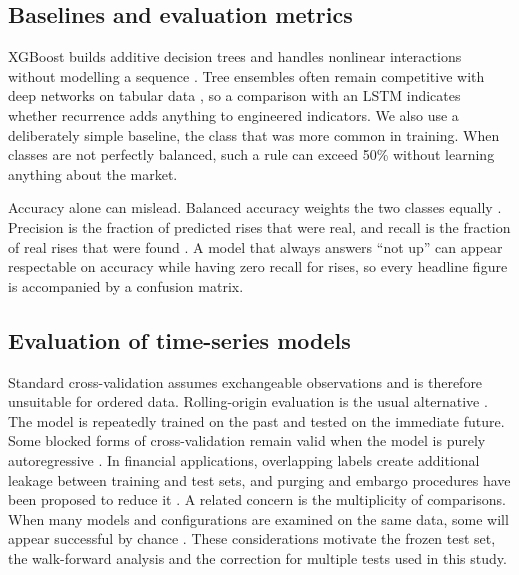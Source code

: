 \subsection{Baselines and evaluation metrics}
XGBoost builds additive decision trees and handles nonlinear interactions without modelling a sequence \cite{chen2016}. Tree ensembles often remain competitive with deep networks on tabular data \cite{grinsztajn2022}, so a comparison with an LSTM indicates whether recurrence adds anything to engineered indicators. We also use a deliberately simple baseline, the class that was more common in training. When classes are not perfectly balanced, such a rule can exceed 50\% without learning anything about the market.

Accuracy alone can mislead. Balanced accuracy weights the two classes equally \cite{brodersen2010}. Precision is the fraction of predicted rises that were real, and recall is the fraction of real rises that were found \cite{sokolova2009}. A model that always answers ``not up'' can appear respectable on accuracy while having zero recall for rises, so every headline figure is accompanied by a confusion matrix.

\subsection{Evaluation of time-series models}
Standard cross-validation assumes exchangeable observations and is therefore unsuitable for ordered data. Rolling-origin evaluation is the usual alternative \cite{tashman2000,hyndman2021}. The model is repeatedly trained on the past and tested on the immediate future. Some blocked forms of cross-validation remain valid when the model is purely autoregressive \cite{bergmeir2012}. In financial applications, overlapping labels create additional leakage between training and test sets, and purging and embargo procedures have been proposed to reduce it \cite{lopezdeprado2018}. A related concern is the multiplicity of comparisons. When many models and configurations are examined on the same data, some will appear successful by chance \cite{bailey2014,harvey2016}. These considerations motivate the frozen test set, the walk-forward analysis and the correction for multiple tests used in this study.

